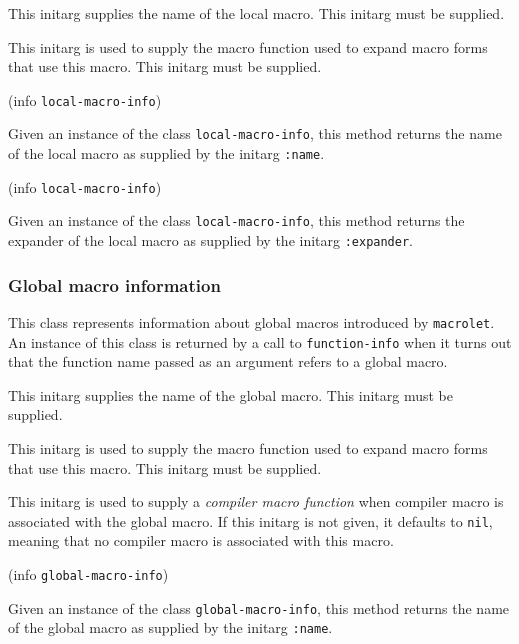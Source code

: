 
This initarg supplies the name of the local macro.  This initarg
must be supplied.


This initarg is used to supply the macro function used to expand macro
forms that use this macro.  This initarg must be supplied. 

 {(info {\tt local-macro-info})}

Given an instance of the class \texttt{local-macro-info}, this
method returns the name of the local macro as supplied by the
initarg \texttt{:name}.

 {(info {\tt local-macro-info})}

Given an instance of the class \texttt{local-macro-info}, this
method returns the expander of the local macro as supplied by the
initarg \texttt{:expander}.

\subsubsection{Global macro information}


This class represents information about global macros introduced by
\texttt{macrolet}.  An instance of this class is returned by a call to
\texttt{function-info} when it turns out that the function name passed
as an argument refers to a global macro.


This initarg supplies the name of the global macro.  This initarg
must be supplied.


This initarg is used to supply the macro function used to expand macro
forms that use this macro.  This initarg must be supplied. 


This initarg is used to supply a \emph{compiler macro function} when
compiler macro is associated with the global macro.  If this
initarg is not given, it defaults to \texttt{nil}, meaning that no
compiler macro is associated with this macro. 

 {(info {\tt global-macro-info})}

Given an instance of the class \texttt{global-macro-info}, this
method returns the name of the global macro as supplied by the
initarg \texttt{:name}.

